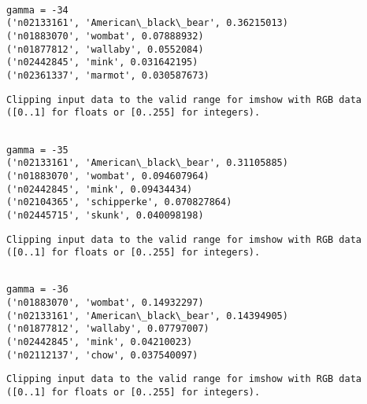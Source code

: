 \documentclass[11pt]{article}
\begin{document}
    \begin{Verbatim}[commandchars=\\\{\}]

gamma = -34
('n02133161', 'American\_black\_bear', 0.36215013)
('n01883070', 'wombat', 0.07888932)
('n01877812', 'wallaby', 0.0552084)
('n02442845', 'mink', 0.031642195)
('n02361337', 'marmot', 0.030587673)

    \end{Verbatim}

    \begin{Verbatim}[commandchars=\\\{\}]
Clipping input data to the valid range for imshow with RGB data ([0..1] for floats or [0..255] for integers).

    \end{Verbatim}

    \begin{Verbatim}[commandchars=\\\{\}]

gamma = -35
('n02133161', 'American\_black\_bear', 0.31105885)
('n01883070', 'wombat', 0.094607964)
('n02442845', 'mink', 0.09434434)
('n02104365', 'schipperke', 0.070827864)
('n02445715', 'skunk', 0.040098198)

    \end{Verbatim}

    \begin{Verbatim}[commandchars=\\\{\}]
Clipping input data to the valid range for imshow with RGB data ([0..1] for floats or [0..255] for integers).

    \end{Verbatim}

    \begin{Verbatim}[commandchars=\\\{\}]

gamma = -36
('n01883070', 'wombat', 0.14932297)
('n02133161', 'American\_black\_bear', 0.14394905)
('n01877812', 'wallaby', 0.07797007)
('n02442845', 'mink', 0.04210023)
('n02112137', 'chow', 0.037540097)

    \end{Verbatim}

    \begin{Verbatim}[commandchars=\\\{\}]
Clipping input data to the valid range for imshow with RGB data ([0..1] for floats or [0..255] for integers).

    \end{Verbatim}
\end{document}
